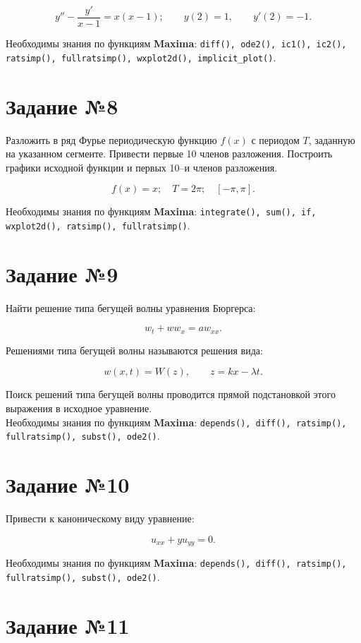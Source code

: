 	\[
		y'' - \frac{y'}{x - 1} = x (x - 1); \qquad y(2) = 1, \qquad y'(2) = -1.
	\]
	
	Необходимы знания по функциям \textbf{Maxima}: {\tt diff(), ode2(), ic1(), ic2(), ratsimp(), fullratsimp(), wxplot2d(), implicit\_plot()}.

\section*{Задание №8}

	Разложить в ряд Фурье периодическую функцию $f(x)$ с периодом $T$, заданную на указанном сегменте. Привести первые 10 членов разложения. Построить графики исходной функции и первых 10--и членов разложения.
	
	\[
		f(x) = x; \quad T = 2 \pi; \quad [-\pi, \pi].
	\]
	
	Необходимы знания по функциям \textbf{Maxima}: {\tt integrate(), sum(), if, wxplot2d(), ratsimp(), fullratsimp()}.

\section*{Задание №9}

    Найти решение типа бегущей волны уравнения Бюргерса:
    
    \[
        w_{t} + w w_{x} = a w_{xx}.
    \]

    Решениями типа бегущей волны называются решения вида:

    \[
        w(x, t) = W(z), \qquad z = k x - \lambda t.
    \]

    Поиск решений типа бегущей волны проводится прямой подстановкой этого выражения в исходное уравнение.\\

    Необходимы знания по функциям \textbf{Maxima}: {\tt depends(), diff(), ratsimp(), fullratsimp(), subst(), ode2()}.

\section*{Задание №10}

	Привести к каноническому виду уравнение:

	\[
		u_{xx} + y u_{yy} = 0.
	\]

	Необходимы знания по функциям \textbf{Maxima}: {\tt depends(), diff(), ratsimp(), fullratsimp(), subst(), ode2()}.

\section*{Задание №11}

